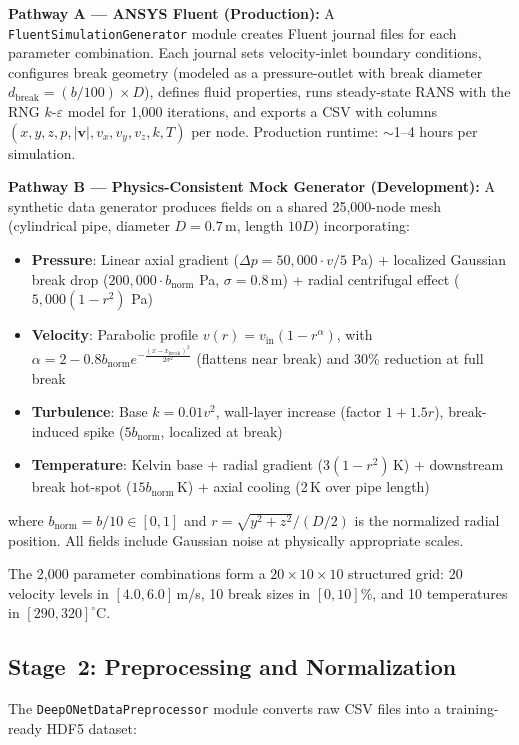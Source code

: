 \documentclass[conference]{IEEEtran}
\begin{document}
\textbf{Pathway A --- ANSYS Fluent (Production):}
A \texttt{FluentSimulationGenerator} module creates Fluent journal files for each parameter combination. Each journal sets velocity-inlet boundary conditions, configures break geometry (modeled as a pressure-outlet with break diameter $d_\text{break} = (b/100) \times D$), defines fluid properties, runs steady-state RANS with the RNG $k$-$\varepsilon$ model for 1,000 iterations, and exports a CSV with columns $(x, y, z, p, |\bm{v}|, v_x, v_y, v_z, k, T)$ per node. Production runtime: $\sim$1--4 hours per simulation.

\textbf{Pathway B --- Physics-Consistent Mock Generator (Development):}
A synthetic data generator produces fields on a shared 25,000-node mesh (cylindrical pipe, diameter $D = 0.7$\,m, length $10D$) incorporating:
\begin{itemize}
    \item \textbf{Pressure}: Linear axial gradient ($\Delta p = 50{,}000 \cdot v/5$ Pa) + localized Gaussian break drop ($200{,}000 \cdot b_\text{norm}$ Pa, $\sigma = 0.8$\,m) + radial centrifugal effect ($5{,}000(1 - r^2)$ Pa)
    \item \textbf{Velocity}: Parabolic profile $v(r) = v_\text{in}(1 - r^{\alpha})$, with $\alpha = 2 - 0.8 b_\text{norm} e^{-\frac{(x - x_\text{break})^2}{2\sigma^2}}$ (flattens near break) and 30\% reduction at full break
    \item \textbf{Turbulence}: Base $k = 0.01 v^2$, wall-layer increase (factor $1 + 1.5r$), break-induced spike ($5 b_\text{norm}$, localized at break)
    \item \textbf{Temperature}: Kelvin base + radial gradient ($3(1-r^2)$\,K) + downstream break hot-spot ($15 b_\text{norm}$\,K) + axial cooling (2\,K over pipe length)
\end{itemize}
where $b_\text{norm} = b/10 \in [0,1]$ and $r = \sqrt{y^2 + z^2}/(D/2)$ is the normalized radial position. All fields include Gaussian noise at physically appropriate scales.

The 2,000 parameter combinations form a $20 \times 10 \times 10$ structured grid: 20 velocity levels in $[4.0, 6.0]$\,m/s, 10 break sizes in $[0, 10]$\%, and 10 temperatures in $[290, 320]^\circ$C.

\subsection{Stage~2: Preprocessing and Normalization}

The \texttt{DeepONetDataPreprocessor} module converts raw CSV files into a training-ready HDF5 dataset:
\end{document}
